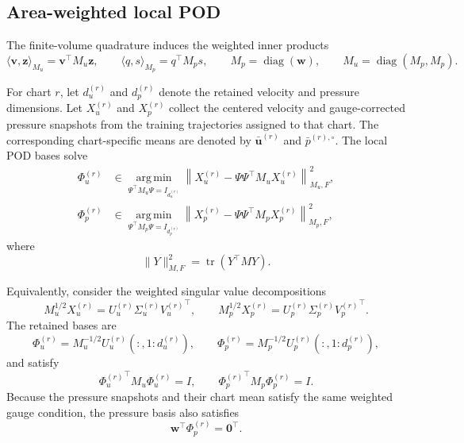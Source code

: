 \documentclass{article}
\begin{document}
\subsection{Area-weighted local POD}

The finite-volume quadrature induces the weighted inner products
\begin{equation}
    \langle\bm v,\bm z\rangle_{M_u}
    =
    \bm v^\top M_u\bm z,
    \qquad
    \langle q,s\rangle_{M_p}
    =
    q^\top M_p s,
    \qquad
    M_p=\operatorname{diag}(\bm w),
    \qquad
    M_u=\operatorname{diag}(M_p,M_p).
    \label{eq:app_weighted_inner_products}
\end{equation}

For chart $r$, let $d_u^{(r)}$ and $d_p^{(r)}$ denote the retained velocity
and pressure dimensions.
Let $X_u^{(r)}$ and $X_p^{(r)}$ collect the centered velocity and
gauge-corrected pressure snapshots from the training trajectories assigned
to that chart.
The corresponding chart-specific means are denoted by
$\bar{\bm u}^{(r)}$ and $\bar p^{(r),\circ}$.
The local POD bases solve
\begin{align}
    \Phi_u^{(r)}
    &\in
    \underset{\Psi^\top M_u\Psi=I_{d_u^{(r)}}}
    {\operatorname{arg\,min}}
    \left\|
        X_u^{(r)}
        -\Psi\Psi^\top M_uX_u^{(r)}
    \right\|_{M_u,F}^2,
    \\
    \Phi_p^{(r)}
    &\in
    \underset{\Psi^\top M_p\Psi=I_{d_p^{(r)}}}
    {\operatorname{arg\,min}}
    \left\|
        X_p^{(r)}
        -\Psi\Psi^\top M_pX_p^{(r)}
    \right\|_{M_p,F}^2,
    \label{eq:app_pod_optimization}
\end{align}
where
\begin{equation}
    \|Y\|_{M,F}^2=\operatorname{tr}(Y^\top MY).
\end{equation}

Equivalently, consider the weighted singular value decompositions
\begin{equation}
    M_u^{1/2}X_u^{(r)}
    =
    U_u^{(r)}\Sigma_u^{(r)}{V_u^{(r)}}^\top,
    \qquad
    M_p^{1/2}X_p^{(r)}
    =
    U_p^{(r)}\Sigma_p^{(r)}{V_p^{(r)}}^\top.
\end{equation}
The retained bases are
\begin{equation}
    \Phi_u^{(r)}
    =
    M_u^{-1/2}
    U_u^{(r)}(:,1{:}d_u^{(r)}),
    \qquad
    \Phi_p^{(r)}
    =
    M_p^{-1/2}
    U_p^{(r)}(:,1{:}d_p^{(r)}),
    \label{eq:app_weighted_svd_bases}
\end{equation}
and satisfy
\begin{equation}
    {\Phi_u^{(r)}}^\top M_u\Phi_u^{(r)}=I,
    \qquad
    {\Phi_p^{(r)}}^\top M_p\Phi_p^{(r)}=I.
\end{equation}
Because the pressure snapshots and their chart mean satisfy the same weighted
gauge condition, the pressure basis also satisfies
\begin{equation}
    \bm w^\top\Phi_p^{(r)}=\bm 0^\top .
\end{equation}
\end{document}
